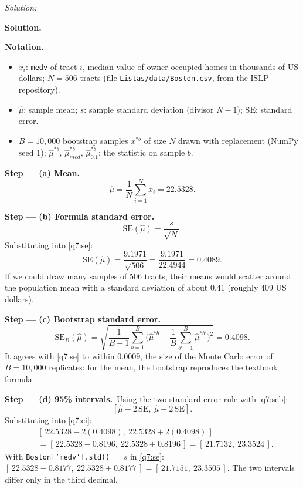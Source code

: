 \documentclass[11pt,a4paper]{article}
\newif\ifsolucoes
\newcommand{\espacoresol}{4.5cm}   %
\numberwithin{equation}{questao}   %
\newenvironment{notacao}{\par\smallskip\noindent\textbf{Notation.}\begin{itemize}[leftmargin=1.4em,topsep=1pt,itemsep=0pt]\small}{\end{itemize}}
\newcommand{\resolespaco}{\ifsolucoes\else\par\textit{Solution:}\vspace{\espacoresol}\par\fi}
\newcommand{\passo}[2]{\par\smallskip\noindent\textbf{Step --- #1.}~#2}
\newcommand{\solhead}{\par\medskip\noindent{\color{blue!55!black}\rule{\linewidth}{0.3pt}}\par\noindent\textbf{Solution.}}
\begin{document}
\resolespaco
\begin{sol}
\solhead
\begin{notacao}
\item $x_i$: \texttt{medv} of tract $i$, median value of owner-occupied homes in thousands of US
  dollars; $N=506$ tracts (file \texttt{Listas/data/Boston.csv}, from the ISLP repository).
\item $\hat\mu$: sample mean; $s$: sample standard deviation (divisor $N-1$); $\mathrm{SE}$: standard
  error.
\item $B=10{,}000$ bootstrap samples $x^{*b}$ of size $N$ drawn with replacement (NumPy seed 1);
  $\hat\mu^{*b}$, $\hat\mu^{*b}_{med}$, $\hat\mu^{*b}_{0.1}$: the statistic on sample $b$.
\end{notacao}

\passo{(a) Mean}{}
\begin{equation}\label{q7:mean}
\hat\mu=\frac1N\sum_{i=1}^Nx_i=22.5328 .
\end{equation}

\passo{(b) Formula standard error}{}
\begin{equation}\label{q7:se}
\mathrm{SE}(\hat\mu)=\frac{s}{\sqrt N}.
\end{equation}
Substituting into \eqref{q7:se}:
\[
\mathrm{SE}(\hat\mu)=\frac{9.1971}{\sqrt{506}}=\frac{9.1971}{22.4944}=0.4089 .
\]
If we could draw many samples of 506 tracts, their means would scatter around the population mean
with a standard deviation of about 0.41 (roughly 409 US dollars).

\passo{(c) Bootstrap standard error}{}
\begin{equation}\label{q7:seb}
\mathrm{SE}_B(\hat\mu)=\sqrt{\frac1{B-1}\sum_{b=1}^B\Big(\hat\mu^{*b}-\frac1B\sum_{b'=1}^B\hat\mu^{*b'}\Big)^2}=0.4098 .
\end{equation}
It agrees with \eqref{q7:se} to within $0.0009$, the size of the Monte Carlo error of $B=10{,}000$
replicates: for the mean, the bootstrap reproduces the textbook formula.

\passo{(d) 95\% intervals}{Using the two-standard-error rule with \eqref{q7:seb}:}
\begin{equation}\label{q7:ci}
[\hat\mu-2\,\mathrm{SE},\ \hat\mu+2\,\mathrm{SE}].
\end{equation}
Substituting into \eqref{q7:ci}:
\begin{align*}
&[\,22.5328-2(0.4098),\ 22.5328+2(0.4098)\,]\\
&=[\,22.5328-0.8196,\ 22.5328+0.8196\,]=[\,21.7132,\ 23.3524\,].
\end{align*}
With \texttt{Boston['medv'].std()} $=s$ in \eqref{q7:se}: $[\,22.5328-0.8177,\ 22.5328+0.8177\,]=[\,21.7151,\ 23.3505\,]$.
The two intervals differ only in the third decimal.


\end{sol}
\end{document}
